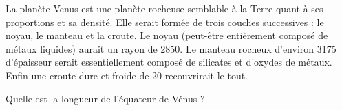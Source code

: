 
\begin{exercice}\label{exosmath-0759}

    La planète Venus est une planète rocheuse semblable à la Terre quant à ses proportions et sa densité. Elle serait formée de trois couches successives : le noyau, le manteau et la croute. Le noyau (peut-être entièrement composé de métaux liquides) aurait un rayon de \unit{2850}{\kilo\meter}. Le manteau rocheux d'environ \unit{3175}{\kilo\meter} d'épaisseur serait essentiellement composé de silicates et d'oxydes de métaux. Enfin une croute dure et froide de \unit{20}{\kilo\meter} recouvrirait le tout.

    Quelle est la longueur de l'équateur de Vénus ?

\end{exercice}
